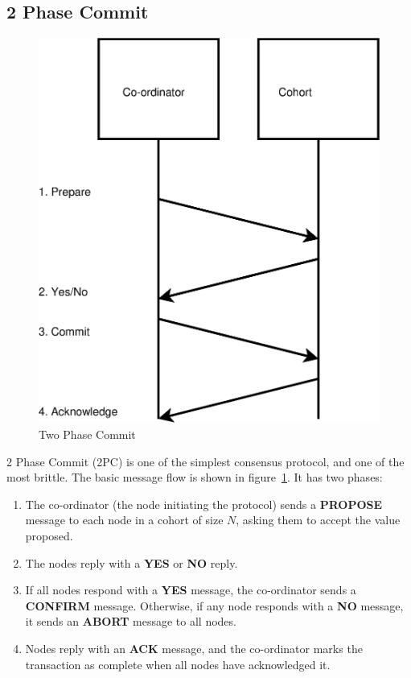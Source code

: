 \documentclass[12pt,twoside,notitlepage]{report}
\newcommand{\msg}[1] {{\bf #1}}         %
\begin{document}
\subsection*{2 Phase Commit}

\begin{figure}[htb]
\centering
\includegraphics[scale=0.5]{figs/two-pc.eps}
\caption{\label{fig:two-pc}Two Phase Commit}
\end{figure}

2 Phase Commit (2PC) is one of the simplest consensus protocol, and one of the most brittle. The
basic message flow is shown in figure~\ref{fig:two-pc}. It has two phases:

\begin{enumerate}
\item The co-ordinator (the node initiating the protocol) sends a \msg{PROPOSE} message to each
	node in a cohort of size $N$, asking them to accept the value proposed.
\item The nodes reply with a \msg{YES} or \msg{NO} reply.
\item If all nodes respond with a \msg{YES} message, the co-ordinator sends a \msg{CONFIRM} message. Otherwise, if
	any node responds with a \msg{NO} message, it sends an \msg{ABORT} message to all nodes.
\item Nodes reply with an \msg{ACK} message, and the co-ordinator marks the transaction as
	complete when all nodes have acknowledged it.
\end{enumerate}
\end{document}
